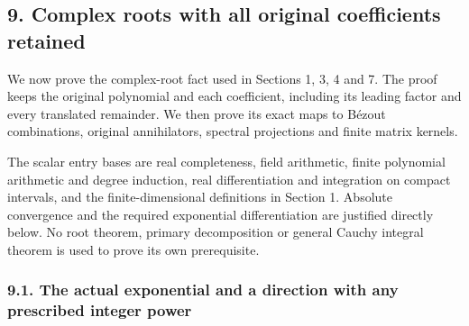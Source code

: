 \documentclass[
  11pt,
]{article}
\begin{document}
\subsection{9. Complex roots with all original coefficients
retained}\label{complex-roots-with-all-original-coefficients-retained}

We now prove the complex-root fact used in Sections 1, 3, 4 and 7. The
proof keeps the original polynomial and each coefficient, including its
leading factor and every translated remainder. We then prove its exact
maps to Bézout combinations, original annihilators, spectral projections
and finite matrix kernels.

The scalar entry bases are real completeness, field arithmetic, finite
polynomial arithmetic and degree induction, real differentiation and
integration on compact intervals, and the finite-dimensional definitions
in Section 1. Absolute convergence and the required exponential
differentiation are justified directly below. No root theorem, primary
decomposition or general Cauchy integral theorem is used to prove its
own prerequisite.

\subsubsection{9.1. The actual exponential and a direction with any
prescribed integer
power}\label{the-actual-exponential-and-a-direction-with-any-prescribed-integer-power}
\end{document}
